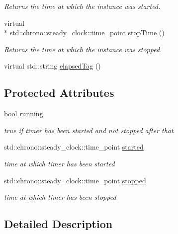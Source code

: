 \begin{DoxyCompactItemize}
\begin{DoxyCompactList}\small\item\em Returns the time at which the instance was started. \end{DoxyCompactList}\item 
virtual \\*
std\-::chrono\-::steady\-\_\-clock\-::time\-\_\-point \hyperlink{class_aux_1_1_timer_a2ecdbad6184276140eb88480d04b417e}{stop\-Time} ()
\begin{DoxyCompactList}\small\item\em Returns the time at which the instance was stopped. \end{DoxyCompactList}\item 
virtual std\-::string \hyperlink{class_aux_1_1_timer_a428b45cb66f4be47bbea61b0db368142}{elapsed\-Tag} ()
\end{DoxyCompactItemize}
\subsection*{Protected Attributes}
\begin{DoxyCompactItemize}
\item 
bool \hyperlink{class_aux_1_1_timer_a5a85ed37ed9e2f0eb07e35a465094b9f}{running}
\begin{DoxyCompactList}\small\item\em true if timer has been started and not stopped after that \end{DoxyCompactList}\item 
std\-::chrono\-::steady\-\_\-clock\-::time\-\_\-point \hyperlink{class_aux_1_1_timer_a2fde73af550d464ac12d62eb53c3a976}{started}
\begin{DoxyCompactList}\small\item\em time at which timer has been started \end{DoxyCompactList}\item 
std\-::chrono\-::steady\-\_\-clock\-::time\-\_\-point \hyperlink{class_aux_1_1_timer_a2b2db52da1cb51c6940597173133d910}{stopped}
\begin{DoxyCompactList}\small\item\em time at which timer has been stopped \end{DoxyCompactList}\end{DoxyCompactItemize}


\subsection{Detailed Description}


